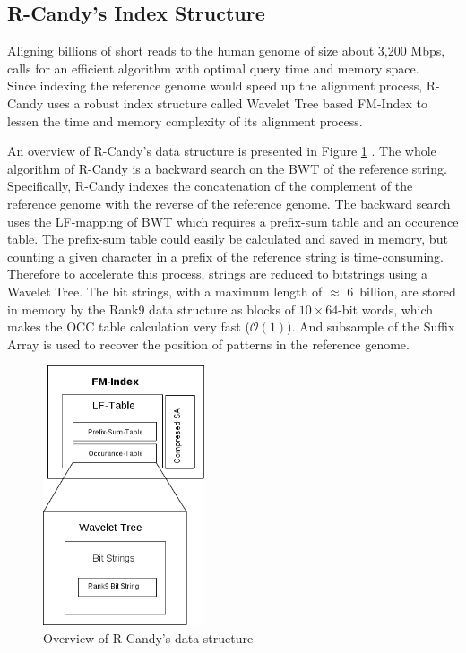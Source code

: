 \documentclass[11pt,a4paper]{report}
\begin{document}
\subsection{R-Candy's Index Structure} 
\label{R-Candy's Index Structure}

Aligning billions of short reads to the human genome of size about 3,200 Mbps, 
calls for an efficient algorithm with optimal query time and memory space.\\ 
Since indexing the reference genome would speed up the alignment process, 
R-Candy uses a robust index structure called Wavelet Tree based FM-Index to 
lessen the time and memory complexity of its alignment process.

An overview of R-Candy's data structure is presented in Figure \ref{DSOverview}
\cite{Wavthesis}. The whole algorithm of R-Candy is a backward search on the 
BWT of the reference string. Specifically, R-Candy indexes the concatenation of
the complement of the reference genome with the reverse of the reference genome. 
The backward search uses the LF-mapping of BWT which requires a prefix-sum table
and an occurence table. The prefix-sum table could easily be calculated and saved 
in memory, but counting a given character in a prefix of the reference string
is time-consuming. Therefore to accelerate this process, strings are reduced to 
bitstrings using a  Wavelet Tree. The bit strings, with a maximum length of 
$\approx$ 6~billion, are stored in memory by the Rank9 data structure as blocks 
of $10 \times 64$-bit words, which makes the OCC table calculation very fast 
($\mathcal{O}(1)$). And subsample of the Suffix Array is used to recover the 
position of patterns in the reference genome.


\begin{figure}[H]
\centering
\includegraphics[width=4.75cm]{pictures/DSOverview2.png}
\caption{Overview of R-Candy's data structure }
\label{DSOverview}
\end{figure}
\end{document}
